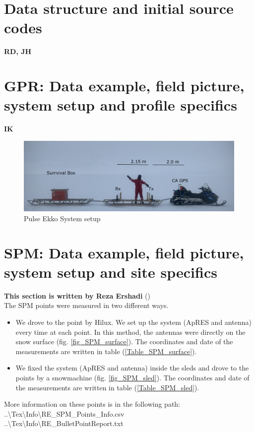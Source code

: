 \documentclass[a4paper,12pt]{article}
\begin{document}
\section{Data structure and initial source codes}
\textbf{RD, JH}
\pagebreak
\section{GPR: Data example, field picture, system setup and profile specifics}
\label{SecGpr}
\textbf{IK}
\begin{figure}[H]
\includegraphics[width=\textwidth]{Figures/PulseEkko/RadarSetup.png}
\caption{Pulse Ekko System setup}
\end{figure}


\pagebreak
\section{SPM: Data example, field picture, system setup and site specifics}
\label{SecSPM}
\textbf{This section is written by Reza Ershadi}
(\href{mailto:mohammadreza.ershadi@uni-tuebingen.de}{\color{blue}{Email Me}})\\

The SPM points were measured in two different ways.
\begin{itemize}
\item We drove to the point by
Hilux. We set up the system (ApRES and antenna) every time at each point. In
this method, the antennas were directly on the snow surface (fig. \ref{fig_SPM_surface}). The
coordinates and date of the measurements are written in table (\ref{Table_SPM_surface}).
\item We fixed the system (ApRES and antenna) inside the sleds and drove to the points by a
snowmachine (fig. \ref{fig_SPM_sled}). The coordinates and date of the measurements are written in
table (\ref{Table_SPM_sled}).
\end{itemize}
More information on these points is in the following path:\\
..\textbackslash Tex\textbackslash Info\textbackslash RE\_SPM\_Points\_Info.csv\\
..\textbackslash Tex\textbackslash Info\textbackslash RE\_BulletPointReport.txt
\end{document}
